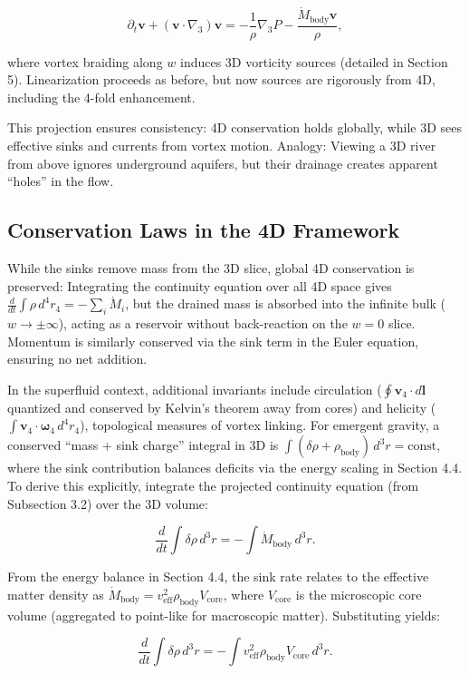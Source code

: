 \documentclass{article}
\begin{document}
\[
\partial_t \mathbf{v} + (\mathbf{v} \cdot \nabla_3) \mathbf{v} = -\frac{1}{\rho} \nabla_3 P - \frac{\dot{M}_{\text{body}} \mathbf{v}}{\rho},
\]

where vortex braiding along $w$ induces 3D vorticity sources (detailed in Section 5). Linearization proceeds as before, but now sources are rigorously from 4D, including the 4-fold enhancement.

This projection ensures consistency: 4D conservation holds globally, while 3D sees effective sinks and currents from vortex motion. Analogy: Viewing a 3D river from above ignores underground aquifers, but their drainage creates apparent ``holes'' in the flow.

\subsection{Conservation Laws in the 4D Framework}

While the sinks remove mass from the 3D slice, global 4D conservation is preserved: Integrating the continuity equation over all 4D space gives $\frac{d}{dt} \int \rho \, d^4 r_4 = -\sum_i \dot{M}_i$, but the drained mass is absorbed into the infinite bulk ($w \to \pm \infty$), acting as a reservoir without back-reaction on the $w=0$ slice. Momentum is similarly conserved via the sink term in the Euler equation, ensuring no net addition.

In the superfluid context, additional invariants include circulation ($\oint \mathbf{v}_4 \cdot d\mathbf{l}$ quantized and conserved by Kelvin's theorem away from cores) and helicity ($\int \mathbf{v}_4 \cdot \boldsymbol{\omega}_4 \, d^4 r_4$), topological measures of vortex linking. For emergent gravity, a conserved ``mass + sink charge'' integral in 3D is $\int (\delta\rho + \rho_{\text{body}}) \, d^3 r = \text{const}$, where the sink contribution balances deficits via the energy scaling in Section 4.4. To derive this explicitly, integrate the projected continuity equation (from Subsection 3.2) over the 3D volume:

\[
\frac{d}{dt} \int \delta\rho \, d^3 r = - \int \dot{M}_{\text{body}} \, d^3 r.
\]

From the energy balance in Section 4.4, the sink rate relates to the effective matter density as $\dot{M}_{\text{body}} = v_{\text{eff}}^2 \rho_{\text{body}} V_{\text{core}}$, where $V_{\text{core}}$ is the microscopic core volume (aggregated to point-like for macroscopic matter). Substituting yields:

\[
\frac{d}{dt} \int \delta\rho \, d^3 r = - \int v_{\text{eff}}^2 \rho_{\text{body}} V_{\text{core}} \, d^3 r.
\]
\end{document}
